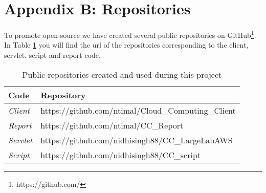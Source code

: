 \section{Appendix B: Repositories}
\label{sec:appb}
To promote open-source we have created several public repositories on GitHub\footnote{https://github.com/}. 
In Table \ref{tab:repo} you will find the url of the repositories corresponding to the client, servlet, script and report code.
	\begin{table} 
 		\begin{center}
   			\begin{tabular}{ | l | l |}
    			\hline \textbf{Code} & \textbf{Repository} \\ \hline
    			\emph{Client} & https://github.com/ntimal/Cloud\_Computing\_Client \\ \hline
    			\emph{Report} & https://github.com/ntimal/CC\_Report \\ \hline
    			\emph{Servlet} & https://github.com/nidhisingh88/CC\_LargeLabAWS \\ \hline
    			\emph{Script} & https://github.com/nidhisingh88/CC\_script \\ \hline
    		\end{tabular}
			\caption{Public repositories created and used during this project}
			\label{tab:repo}
  		\end{center}
	\end{table}